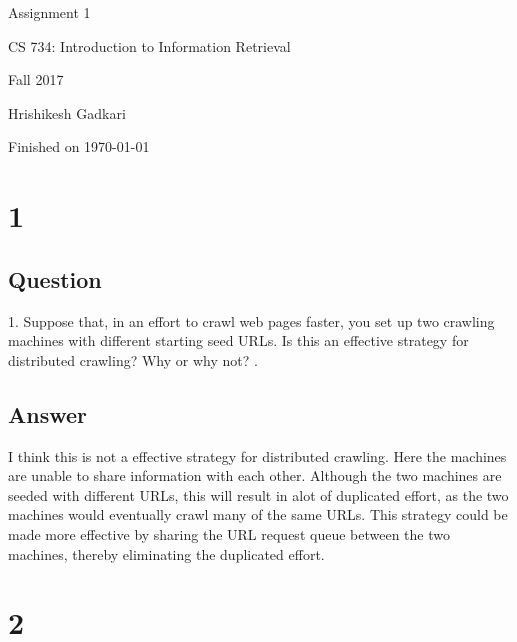 \documentclass[letterpaper,11pt]{article}
\begin{document}
\begin{titlepage}

\begin{center}

\Huge{Assignment 1}

\Large{CS 734:  Introduction to Information Retrieval}

\Large{Fall 2017}

\Large{Hrishikesh Gadkari}

\Large Finished on \today

\end{center}

\end{titlepage}

\newpage


\section*{1}

\subsection*{Question}


1.   Suppose that, in an eﬀort to crawl web pages faster, you set up two crawling machines with diﬀerent starting seed URLs. Is this an eﬀective strategy for distributed crawling? Why or why not? .


\subsection*{Answer}

I think this is not a effective strategy for distributed crawling. Here the  machines are unable to share information with each other. Although the two machines are seeded with different URLs, this will result in alot of duplicated effort, as the two machines would eventually crawl many of the same URLs. This strategy could be made more effective by sharing the URL request queue between the two machines, thereby eliminating the duplicated effort.

\clearpage


\section*{2}
\end{document}
